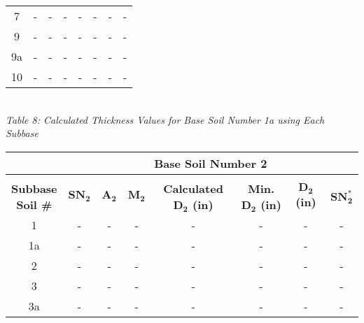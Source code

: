 \documentclass{article}
\begin{document}
\begin{center}
\begin{spacing}{1.6}
\begin{tabular}{|c|ccccccc|}
                                            7       & -     & -    & -    & -                    & -              & -         & -       \\
                                            9       & -     & -    & -    & -                    & -              & -         & -       \\
                                            9a      & -     & -    & -    & -                    & -              & -         & -       \\
                                            10      & -     & -    & -    & -                    & -              & -         & -       \\\hline
        \end{tabular}
        \vspace{3mm}
        \emph{\\Table 8: Calculated Thickness Values for Base Soil Number 1a using Each Subbase}
        \begin{tabular}{|c|ccccccc|}
            \hline    
            \multicolumn{1}{|l}{}                     & \multicolumn{7}{c|}{\textbf{Base Soil Number 2}}                                              \\\hline
            &&&&&&&\\
             \shortstack[c]{\textbf{Subbase}\\\textbf{Soil \#}} & $\bm{SN_2}$ & $\bm{A_2}$ & $\bm{M_2}$ & \textbf{Calculated $\bm{D_2}$ (in)} & \textbf{Min. $\bm{D_2}$ (in)} & \textbf{$\bm{D_2}$ (in)} & $\bm{SN_2^*}$  \\\hline
                                            1       & -     & -    & -    & -                    & -              & -         & -       \\
                                            1a      & -     & -    & -    & -                    & -              & -         & -       \\
                                            2       & -     & -    & -    & -                    & -              & -         & -       \\
                                            3       & -     & -    & -    & -                    & -              & -         & -       \\
                                            3a      & -     & -    & -    & -                    & -              & -         & -       \\

\end{tabular}
\end{spacing}
\end{center}
\end{document}

